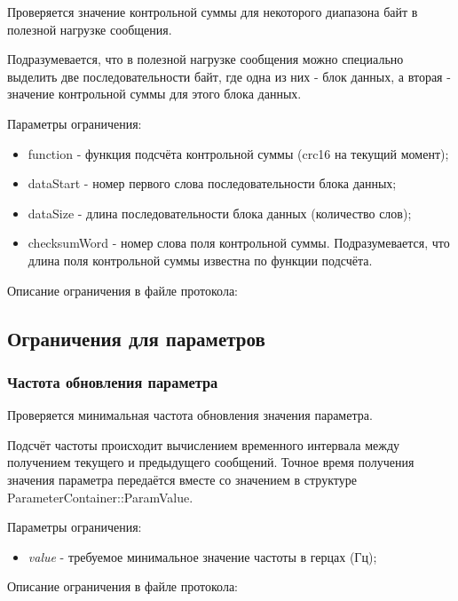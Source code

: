 Проверяется значение контрольной суммы для некоторого диапазона байт в полезной 
нагрузке сообщения.

Подразумевается, что в полезной нагрузке сообщения можно специально выделить 
две последовательности байт, где одна из них - блок данных, а вторая - значение 
контрольной суммы для этого блока данных.

Параметры ограничения:

\begin{itemize}
 \item function - функция подсчёта контрольной суммы (crc16 на текущий момент);
 \item dataStart - номер первого слова последовательности блока данных;
 \item dataSize - длина последовательности блока данных (количество слов);
 \item checksumWord - номер слова поля контрольной суммы. 
Подразумевается, что длина поля контрольной суммы известна по функции подсчёта.
\end{itemize}

Описание ограничения в файле протокола:



\subsection{Ограничения для параметров}
\label{subsec:param_restricts}

\subsubsection{Частота обновления параметра}

Проверяется минимальная частота обновления значения параметра.

Подсчёт частоты происходит вычислением временного интервала между получением 
текущего и предыдущего сообщений. Точное время получения значения
параметра передаётся вместе со значением в структуре 
ParameterContainer::ParamValue.

Параметры ограничения:

\begin{itemize}
 \item \textit{value} - требуемое минимальное значение частоты в герцах (Гц);
\end{itemize}

Описание ограничения в файле протокола:

